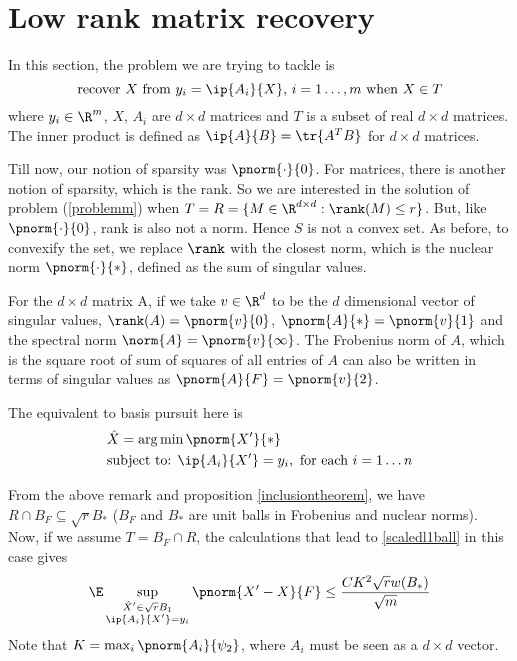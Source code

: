 \section{Low rank matrix recovery}
	In this section, the problem we are trying to tackle is
\begin{equation}\label{problemm}
	\text{recover }X\text{ from }y_i = \ip{A_i}{X},
	\,i=1\ldots, m \text{ when }X \in T
\end{equation}
where $y_i\in\R^m$, $X$, $A_i$ are $d\times d$ matrices
and $T$ is a subset of real $d\times d$ matrices.
The inner product is defined as  $\ip{A}{B}= \tr{A^T B}$
for $d\times d$ matrices.

	Till now, our notion of sparsity was $\pnorm{\cdot}{0}$.
For matrices, there is another notion of sparsity,
which is the rank.
So we are interested in the solution of problem (\ref{problemm})
when $T = R = \{M\in \R^{d\times d}: \rank(M)\leq r\}$.
But, like $\pnorm{\cdot}{0}$, rank is
also not a norm. Hence $S$ is not a convex set.
As before, to convexify the set, we replace $\rank$ with the
closest norm, which is the nuclear norm $\pnorm{\cdot}{*}$,
defined as the sum of singular values.

\begin{remark}\label{matrixnormsremark}
	For the $d\times d$ matrix A, if we take $v\in\R^d$ to
	be the $d$ dimensional vector of singular values,
	$\rank(A) = \pnorm{v}{0}$, $\pnorm{A}{*} = \pnorm{v}{1}$
	and the spectral norm $\norm{A} = \pnorm{v}{\infty}$.
	The Frobenius norm of $A$, which is the square root of
	sum of squares of all entries of $A$ can also be written
	in terms of singular values as $\pnorm{A}{F} = \pnorm{v}{2}$.
\end{remark}

The equivalent to basis pursuit here is
\begin{equation}\label{mbasispursuit}
	\begin{split}
		&\hat{X} = \arg\min\pnorm{X'}{*}\\
		&\text{subject to: } \ip{A_i}{X'} = y_i,\text{ for each }
		i = 1\ldots n
	\end{split}
\end{equation}

From the above remark and proposition \ref{inclusiontheorem},
we have $R\cap B_F \subseteq \sqrt{r}B_*$ ($B_F$ and $B_*$ are
unit balls in Frobenius and nuclear norms).
Now, if we assume $T =  B_F\cap R$, the calculations that
lead to \eqref{scaledl1ball} in this case gives
\begin{equation}\label{errorm}
	\E\sup_{\substack{\hat{X}'\in \sqrt{r}B_1\\ \ip{A_i}{X'} = y_i}}
	\pnorm{X'-X}{F}\leq \frac{CK^2\sqrt{r} w(B_*)}{\sqrt{m}}
\end{equation}
Note that $K = \max_i \pnorm{A_i}{\psi_2}$, where $A_i$
must be seen as a $d\times d$ vector.

